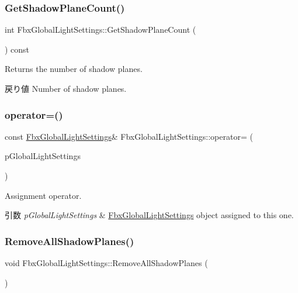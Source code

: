 \subsubsection{\texorpdfstring{Get\+Shadow\+Plane\+Count()}{GetShadowPlaneCount()}}
{\footnotesize\ttfamily int Fbx\+Global\+Light\+Settings\+::\+Get\+Shadow\+Plane\+Count (\begin{DoxyParamCaption}{ }\end{DoxyParamCaption}) const}

Returns the number of shadow planes. \begin{DoxyReturn}{戻り値}
Number of shadow planes. 
\end{DoxyReturn}
\mbox{\label{class_fbx_global_light_settings_a9a3f96233b7ede9ad5f804d10f5e024b}} 
\subsubsection{\texorpdfstring{operator=()}{operator=()}}
{\footnotesize\ttfamily const \hyperlink{class_fbx_global_light_settings}{Fbx\+Global\+Light\+Settings}\& Fbx\+Global\+Light\+Settings\+::operator= (\begin{DoxyParamCaption}\item[{const \hyperlink{class_fbx_global_light_settings}{Fbx\+Global\+Light\+Settings} \&}]{p\+Global\+Light\+Settings }\end{DoxyParamCaption})}

Assignment operator. 
\begin{DoxyParams}{引数}
{\em p\+Global\+Light\+Settings} & \hyperlink{class_fbx_global_light_settings}{Fbx\+Global\+Light\+Settings} object assigned to this one. \\
\hline
\end{DoxyParams}
\mbox{\label{class_fbx_global_light_settings_af46551f80ebf82ab4d9d338ba41fce8c}} 
\subsubsection{\texorpdfstring{Remove\+All\+Shadow\+Planes()}{RemoveAllShadowPlanes()}}
{\footnotesize\ttfamily void Fbx\+Global\+Light\+Settings\+::\+Remove\+All\+Shadow\+Planes (\begin{DoxyParamCaption}{ }\end{DoxyParamCaption})}



